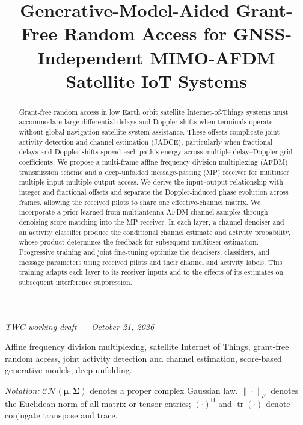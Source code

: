 \documentclass[10pt,journal]{IEEEtran}
\title{Generative-Model-Aided Grant-Free Random Access for GNSS-Independent MIMO-AFDM Satellite IoT Systems}
\author{}
\newcommand{\CN}{\mathcal{CN}}
\newcommand{\tr}{\operatorname{tr}}
\begin{document}
\maketitle
\begin{center}
\small\textit{TWC working draft --- October 21, 2026}
\end{center}
\begin{abstract}
Grant-free random access in low Earth orbit satellite Internet-of-Things
systems must accommodate large differential delays and Doppler shifts
when terminals operate without global navigation satellite system
assistance. These offsets complicate joint activity detection and
channel estimation (JADCE), particularly when fractional delays and
Doppler shifts spread each path's energy across multiple delay--Doppler
grid coefficients. We propose a multi-frame affine frequency division multiplexing
(AFDM) transmission scheme and a deep-unfolded message-passing (MP)
receiver for multiuser multiple-input multiple-output access. We derive
the input--output relationship with integer and fractional offsets and
separate the Doppler-induced phase evolution across frames, allowing
the received pilots to share one effective-channel matrix. We incorporate
a prior learned from multiantenna AFDM channel samples through denoising
score matching into the MP receiver. In each
layer, a channel denoiser and an activity classifier produce the
conditional channel estimate and activity probability, whose product
determines the feedback for subsequent multiuser estimation.
Progressive training and joint fine-tuning optimize the denoisers,
classifiers, and message parameters using received pilots and their
channel and activity labels. This training adapts each layer
to its receiver inputs and to the effects of its estimates on subsequent
interference suppression.
\end{abstract}
\begin{IEEEkeywords}
Affine frequency division multiplexing, satellite Internet of Things,
grant-free random access, joint activity detection and channel estimation,
score-based generative models, deep unfolding.
\end{IEEEkeywords}



\noindent\textit{Notation:} $\CN(\bm\mu,\bm\Sigma)$ denotes a proper complex Gaussian law.
$\|\cdot\|_F$ denotes the Euclidean norm of all matrix or tensor entries;
$(\cdot)^{\mathsf H}$ and $\tr(\cdot)$ denote conjugate transpose and trace.





% 
% 

\appendices
{}




\end{document}
